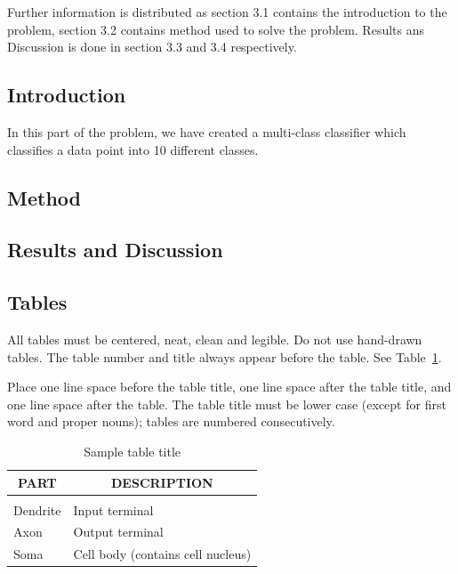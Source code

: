 \documentclass{article} %
\begin{document}
Further information is distributed as section 3.1 contains the introduction to the problem, section 3.2 contains method used to solve the problem. Results ans Discussion is done in section 3.3 and 3.4 respectively.\\ 
\subsection{Introduction}
In this part of the problem, we have created a multi-class classifier which classifies a data point into 10 different classes. 
\subsection{Method}
\subsection{Results and Discussion}

\subsection{Tables}

All tables must be centered, neat, clean and legible. Do not use hand-drawn
tables. The table number and title always appear before the table. See
Table~\ref{sample-table}.

Place one line space before the table title, one line space after the table
title, and one line space after the table. The table title must be lower case
(except for first word and proper nouns); tables are numbered consecutively.

\begin{table}[t]
\caption{Sample table title}
\label{sample-table}
\begin{center}
\begin{tabular}{ll}
\multicolumn{1}{c}{\bf PART}  &\multicolumn{1}{c}{\bf DESCRIPTION}
\\ \hline \\
Dendrite         &Input terminal \\
Axon             &Output terminal \\
Soma             &Cell body (contains cell nucleus) \\
\end{tabular}
\end{center}
\end{table}
\end{document}
